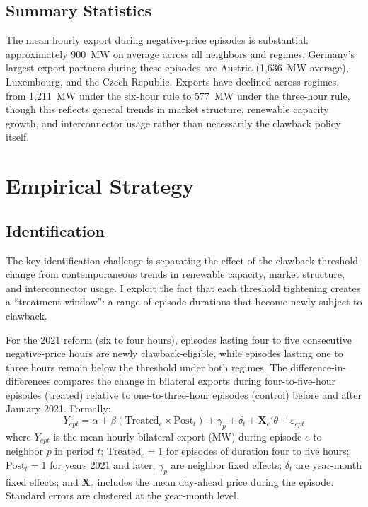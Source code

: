 \documentclass[12pt]{article}
\begin{document}
\subsection{Summary Statistics}



The mean hourly export during negative-price episodes is substantial: approximately 900~MW on average across all neighbors and regimes. Germany's largest export partners during these episodes are Austria (1,636~MW average), Luxembourg, and the Czech Republic. Exports have declined across regimes, from 1,211~MW under the six-hour rule to 577~MW under the three-hour rule, though this reflects general trends in market structure, renewable capacity growth, and interconnector usage rather than necessarily the clawback policy itself.

\section{Empirical Strategy}
\label{sec:strategy}

\subsection{Identification}

The key identification challenge is separating the effect of the clawback threshold change from contemporaneous trends in renewable capacity, market structure, and interconnector usage. I exploit the fact that each threshold tightening creates a ``treatment window'': a range of episode durations that become newly subject to clawback.

For the 2021 reform (six to four hours), episodes lasting four to five consecutive negative-price hours are newly clawback-eligible, while episodes lasting one to three hours remain below the threshold under both regimes. The difference-in-differences compares the change in bilateral exports during four-to-five-hour episodes (treated) relative to one-to-three-hour episodes (control) before and after January 2021. Formally:
\begin{equation}
Y_{ept} = \alpha + \beta (\text{Treated}_e \times \text{Post}_t) + \gamma_p + \delta_t + \mathbf{X}_e'\theta + \varepsilon_{ept}
\label{eq:did}
\end{equation}
where $Y_{ept}$ is the mean hourly bilateral export (MW) during episode $e$ to neighbor $p$ in period $t$; $\text{Treated}_e = 1$ for episodes of duration four to five hours; $\text{Post}_t = 1$ for years 2021 and later; $\gamma_p$ are neighbor fixed effects; $\delta_t$ are year-month fixed effects; and $\mathbf{X}_e$ includes the mean day-ahead price during the episode. Standard errors are clustered at the year-month level.
\end{document}
